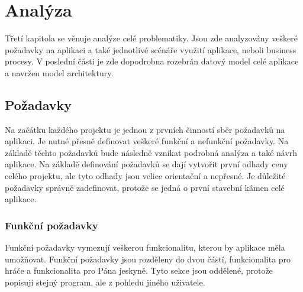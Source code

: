 \documentclass[thesis=B,czech]{resources/FITthesis}[2012/06/26]
\begin{document}
\chapter{Analýza}
Třetí kapitola se věnuje analýze celé problematiky. Jsou zde analyzovány veškeré požadavky na aplikaci a také jednotlivé scénáře využití aplikace, neboli business procesy.  V poslední části je zde dopodrobna rozebrán datový model celé aplikace a navržen model architektury. 

	\section{Požadavky}
Na začátku každého projektu je jednou z prvních činností sběr požadavků na aplikaci. Je nutné přesně definovat veškeré funkční a nefunkční požadavky. Na základě těchto požadavků bude následně vznikat podrobná analýza a také návrh aplikace. Na základě definování požadavků se dají vytvořit první odhady ceny celého projektu, ale tyto odhady jsou velice orientační a nepřesné. Je důležité požadavky správně zadefinovat, protože se jedná o první stavební kámen celé aplikace. 

\subsection{Funkční požadavky}
Funkční požadavky vymezují veškerou funkcionalitu, kterou by aplikace měla umožňovat. Funkční požadavky jsou rozděleny do dvou částí, funkcionalita pro hráče a funkcionalita pro Pána jeskyně. Tyto sekce jsou oddělené, protože popisují stejný program, ale z pohledu jiného uživatele.
\end{document}
